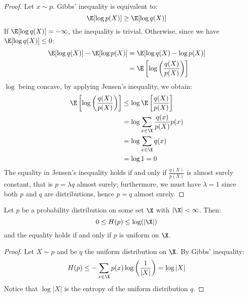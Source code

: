 \documentclass[toc]{../cs-classes/cs-classes}
\begin{document}
\begin{proof}
    Let $x\sim p$. Gibbs' inequality is equivalent to:
    \begin{equation*}
        \E[\log p(X)] \geq \E[\log q(X)]
    \end{equation*}
    If $\E[\log q(X)] = -\infty$, the inequality is trivial. Otherwise, since we have $\E[\log q(X)] \leq 0$:
    \begin{equation*}
        \begin{aligned}
            \E[\log q(X)] - \E[\log p(X)] &= \E[\log q(X) - \log p(X)] \\
            &= \E\left[\log\left(\frac{q(X)}{p(X)}\right)\right]
        \end{aligned}
    \end{equation*}
    $\log$ being concave, by applying Jensen's inequality, we obtain:
    \begin{equation*}
        \begin{aligned}
            \E\left[\log\left(\frac{q(X)}{p(X)}\right)\right] &\leq \log\E\left[\frac{q(X)}{p(X)}\right] \\
            &= \log\sum_{x\in\X} \frac{q(x)}{p(X)}p(x)\\
            &= \log\sum_{x\in\X} q(x)\\
            &= \log 1 = 0
        \end{aligned}
    \end{equation*}
    The equality in Jensen's inequality holds if and only if $\frac{q(X)}{p(X)}$ is almost surely constant, that is $p=\lambda q$ almost surely; furthermore, we must have $\lambda=1$ since both $p$ and $q$ are distributions, hence $p=q$ almost surely. 
\end{proof}

\begin{corollary}
    Let $p$ be a probability distribution on some set $\X$ with $|\X|<\infty$. Then:
    \begin{equation*}
        0\leq H(p) \leq \log(|\X|)
    \end{equation*}
    and the equality holds if and only if $p$ is uniform on $\X$.
\end{corollary}

\begin{proof}
    Let $X \sim p$ and be $q$ the uniform distribution on $\X$. By Gibbs' inequality:
    \begin{equation*}
        H(p) \leq -\sum_{x\in\X}p(x)\log\left(\frac{1}{|X|}\right) = \log|X|
    \end{equation*}
    Notice that $\log|X|$ is the entropy of the uniform distribution $q$.
\end{proof}
\end{document}
